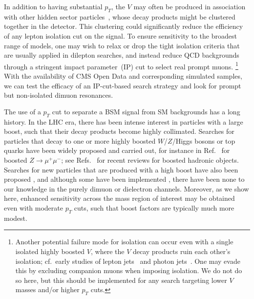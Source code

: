 \documentclass[aps,prd,twocolumn,superscriptaddress,preprintnumbers,nofootinbib,longbibliography,floatfix]{revtex4-1}
\DeclareRobustCommand{\Ref}[1]{Ref.~\cite{#1}}
\DeclareRobustCommand{\Refs}[1]{Refs.~\cite{#1}}
\begin{document}
In addition to having substantial $p_T$, the $V$ may often be produced in association with other hidden sector particles~\cite{Strassler:2006im,Han:2007ae}, whose decay products might be clustered together in the detector.
%
This clustering could significantly reduce the efficiency of any lepton isolation cut on the signal.
%
To ensure sensitivity to the broadest range of models, one may wish to relax or drop the tight isolation criteria that are usually applied in dilepton searches, and instead reduce QCD backgrounds through a stringent impact parameter~(IP) cut to select real prompt muons.%
%
\footnote{Another potential failure mode for isolation can occur even with a single isolated highly boosted $V$, where the $V$ decay products ruin each other's isolation; cf.~early studies of lepton jets~\cite{Baumgart:2009tn,Cheung:2009su,Falkowski:2010cm,Falkowski:2010gv,Aad:2015sms} and photon jets~\cite{Dobrescu:2000jt,Larios:2001ma,Toro:2012sv, Draper:2012xt, Ellis:2012zp}.
%
One may evade this by excluding companion muons when imposing isolation.
%
We do not do so  here, but this should be implemented for any search targeting lower $V$ masses and/or higher $p_T$ cuts.}
%
With the availability of CMS Open Data and corresponding simulated samples, we can test the efficacy of an IP-cut-based search strategy and look for prompt but non-isolated dimuon resonances.


The use of a $p_T$ cut to separate a BSM signal from SM backgrounds has a long history.
%
In the LHC era, there has been intense interest in particles with a large boost, such that their decay products become highly collimated.
%
Searches for particles that decay to one or more highly boosted $W$/$Z$/Higgs bosons or top quarks have been widely proposed and carried out, for instance in \Ref{Chatrchyan:2012tw} for boosted $Z \to \mu^+ \mu^-$; see \Refs{Larkoski:2017jix,Asquith:2018igt} for recent reviews for boosted hadronic objects.
%
Searches for new particles that are produced with a high boost have also been proposed \cite{Strassler:2006im,Han:2007ae,Aguilar-Saavedra:2017zuc,Chakraborty:2017mbz,Aguilar-Saavedra:2017rzt,Aguilar-Saavedra:2018xpl,Collins:2018epr}, and although some have been implemented \cite{Chatrchyan:2012cg,Khachatryan:2015wka,Sirunyan:2018mgs}, there have been none to our knowledge in the purely dimuon  or dielectron channels.
%
Moreover, as we show here, enhanced sensitivity across the mass region of interest may be obtained even with moderate $p_T$ cuts, such that boost factors are typically much more modest.
\end{document}
